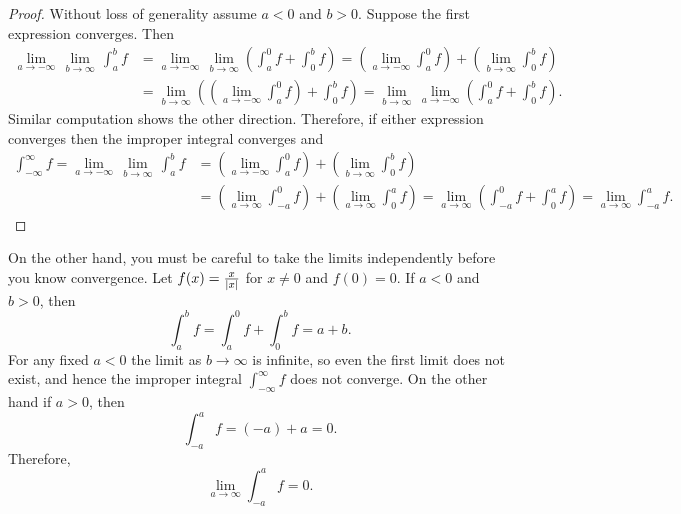 \begin{proof}
Without loss of generality assume $a < 0$ and $b > 0$.  Suppose
the first expression converges.  Then
\begin{equation*}
\begin{split}
\lim_{a \to -\infty} \, \lim_{b \to \infty} \, \int_a^b f
& =
\lim_{a \to -\infty} \, \lim_{b \to \infty}
\left(
\int_a^0 f
+
\int_0^b f
\right)
=
\left(
\lim_{a \to -\infty}
\int_a^0 f
\right)
+
\left(
 \lim_{b \to \infty}
\int_0^b f
\right) \\
& = 
 \lim_{b \to \infty}
\left(
\left(
\lim_{a \to -\infty}
\int_a^0 f
\right) 
+
\int_0^b f
\right)
=
 \lim_{b \to \infty} \,
\lim_{a \to -\infty}
\left(
\int_a^0 f
+
\int_0^b f
\right)  .
\end{split}
\end{equation*}
Similar computation shows the other direction.  Therefore, if
either expression converges then the improper integral converges
and
\begin{equation*}
\begin{split}
\int_{-\infty}^\infty f
=
\lim_{a \to -\infty} \, \lim_{b \to \infty} \, \int_a^b f
& =
\left(
\lim_{a \to -\infty}
\int_a^0 f
\right)
+
\left(
 \lim_{b \to \infty}
\int_0^b f
\right)
\\
& =
\left(
\lim_{a \to \infty}
\int_{-a}^0 f
\right)
+
\left(
 \lim_{a \to \infty}
\int_0^a f
\right)
=
\lim_{a \to \infty}
\left(
\int_{-a}^0 f
+
\int_0^a f
\right)
=
\lim_{a \to \infty}
\int_{-a}^a f .
\end{split}
\end{equation*}
\end{proof}

\begin{example}
On the other hand, you must be careful to
take the limits independently before you know convergence.  Let
$f(x) = \frac{x}{\left\lvert {x} \right\rvert}$ for $x \not= 0$ and $f(0) = 0$.
If $a < 0$ and $b > 0$, then
\begin{equation*}
\int_{a}^b f
=
\int_{a}^0 f
+
\int_{0}^b f
=
a+b .
\end{equation*}
For any fixed $a < 0$ the limit as $b \to \infty$ is infinite, so even
the first limit does not exist, and hence the improper integral
$\int_{-\infty}^\infty f$
does not converge.  On the other hand if $a > 0$, then
\begin{equation*}
\int_{-a}^{a} f
=
(-a)+a = 0 .
\end{equation*}
Therefore,
\begin{equation*}
\lim_{a\to\infty}
\int_{-a}^{a} f
= 0 .
\end{equation*}
\end{example}

